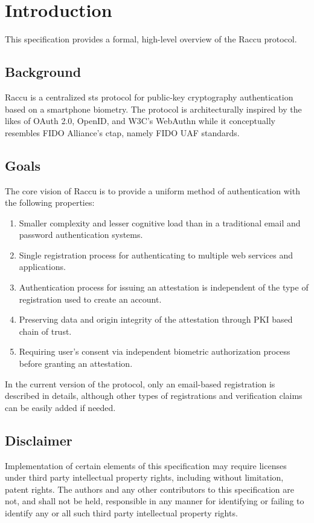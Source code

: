 \section{Introduction}
This specification provides a formal, high-level overview of the Raccu protocol. 

    \subsection{Background}
    Raccu is a centralized \ac{sts} protocol for public-key cryptography authentication based on a 
    smartphone biometry. The protocol is architecturally inspired by the likes of OAuth 2.0, OpenID, 
    and W3C's WebAuthn while it conceptually resembles FIDO Alliance's \ac{ctap}, namely FIDO UAF standards. 

    \subsection{Goals}
    The core vision of Raccu is to provide a uniform method of authentication with the following properties: 
        \begin{enumerate}
            \item Smaller complexity and lesser cognitive load than in a traditional email and password 
                  authentication systems.
            \item Single registration process for authenticating to multiple web services and applications.
            \item Authentication process for issuing an attestation is independent of the type of registration 
                  used to create an account.
            \item Preserving data and origin integrity of the attestation through PKI based chain of trust.
            \item Requiring user's consent via independent biometric authorization process before granting an 
                  attestation.
        \end{enumerate}
    In the current version of the protocol, only an email-based registration is described in details, although 
    other types of registrations and verification claims can be easily added if needed.

    \subsection{Disclaimer}
    Implementation of certain elements of this specification may require licenses under third party intellectual 
    property rights, including without limitation, patent rights. The authors and any other contributors to this 
    specification are not, and shall not be held, responsible in any manner for identifying or failing to identify 
    any or all such third party intellectual property rights.    
    
